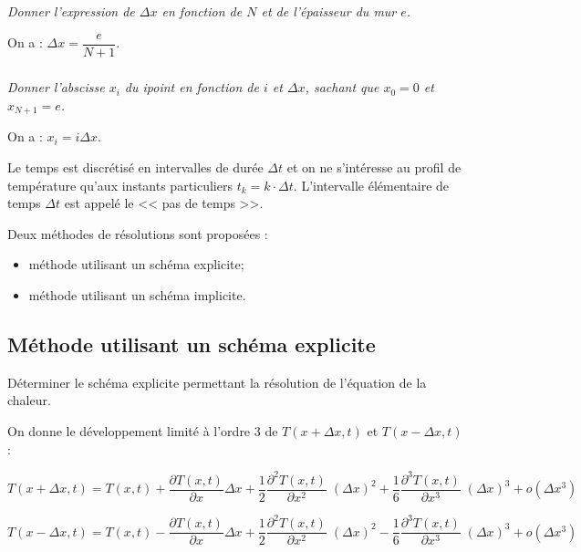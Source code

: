 \documentclass[10pt,fleqn]{article} %
\begin{document}
\begin{multicols}{2}
\subparagraph{\label{q_xini}}\textit{Donner l'expression de $\Delta x$ en fonction de $N$ et de l'épaisseur du mur $e$.}
\ifprof
\begin{corrige}
On a : $\Delta x = \dfrac{e}{N+1}$.
\end{corrige}
\else
\fi


\subparagraph{\label{q_xini2}}\textit{Donner l'abscisse $x_i$ du i\ieme point 
en fonction de $i$ et $\Delta x$, sachant que $x_0=0$ et  $x_{N+1} = e$.}
\ifprof
\begin{corrige}
On a : $x_i = i \Delta x$.
\end{corrige}
\else
\fi
\ifprof
\else
\vspace{.5cm}

Le temps est discrétisé en \textit{} intervalles de durée $\Delta t$ et on ne s'intéresse 
au profil de température qu'aux instants particuliers $t_k = k \cdot \Delta t$. 
L'intervalle élémentaire de temps $\Delta t$ est appelé le << pas de temps >>.

\noindent
Deux méthodes de résolutions sont proposées : 
\begin{itemize}
\item méthode utilisant un schéma explicite;
\item méthode utilisant un schéma implicite.
\end{itemize}
\fi

\subsection*{Méthode utilisant un schéma explicite}
\ifprof
\else
\begin{obj}
Déterminer le schéma explicite permettant la résolution de l'équation de la chaleur.
\end{obj}

On donne le développement limité à l'ordre 3 de $T(x+\Delta x,t)$ et $T(x-\Delta x,t)$ :

$
T(x+\Delta x,t)=T(x,t)+\dfrac{\partial T(x,t)}{\partial x}\Delta x  
+ \dfrac{1}{2}\dfrac{\partial^2 T(x,t)}{\partial x^2} \;\left( \Delta x\right)^2 
+ \dfrac{1}{6}\dfrac{\partial^3 T(x,t)}{\partial x^3} \;\left( \Delta x\right)^3 
+ o\left( \Delta x^3\right)
$

$
T(x-\Delta x,t)=T(x,t)-\dfrac{\partial T(x,t)}{\partial x}\Delta x 
+ \dfrac{1}{2}\dfrac{\partial^2 T(x,t)}{\partial x^2} \;\left( \Delta x\right)^2 
- \dfrac{1}{6}\dfrac{\partial^3 T(x,t)}{\partial x^3}\;\left( \Delta x\right)^3 
+ o\left( \Delta x^3\right)
$
\fi


\end{multicols}
\end{document}
